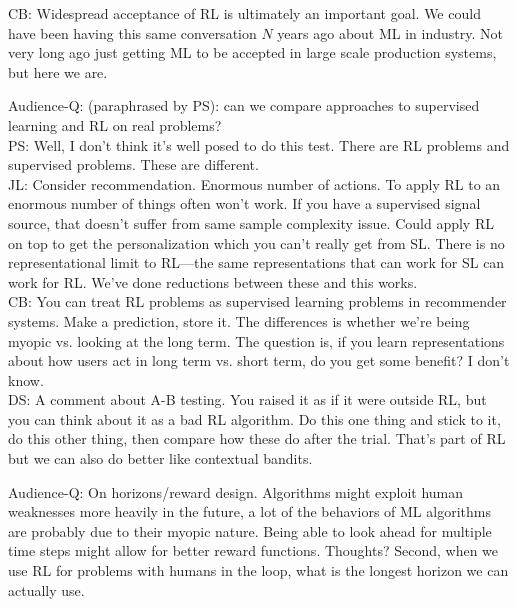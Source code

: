 CB: Widespread acceptance of RL is ultimately an important goal. We could have been having this same conversation $N$ years ago about ML in industry. Not very long ago just getting ML to be accepted in large scale production systems, but here we are. \\

\spacerule 

Audience-Q: (paraphrased by PS): can we compare approaches to supervised learning and RL on real problems? \\

PS: Well, I don't think it's well posed to do this test. There are RL problems and supervised problems. These are different. \\

JL: Consider recommendation. Enormous number of actions. To apply RL to an enormous number of things often won't work. If you have a supervised signal source, that doesn't suffer from same sample complexity issue. Could apply RL on top to get the personalization which you can't really get from SL. There is no representational limit to RL---the same representations that can work for SL can work for RL. We've done reductions between these and this works. \\

CB: You can treat RL problems as supervised learning problems in recommender systems. Make a prediction, store it. The differences is whether we're being myopic vs. looking at the long term. The question is, if you learn representations about how users act in long term vs. short term, do you get some benefit? I don't know. \\

DS: A comment about A-B testing. You raised it as if it were outside RL, but you can think about it as a bad RL algorithm. Do this one thing and stick to it, do this other thing, then compare how these do after the trial. That's part of RL but we can also do better like contextual bandits. \\

\spacerule

Audience-Q: On horizons/reward design. Algorithms might exploit human weaknesses more heavily in the future, a lot of the behaviors of ML algorithms are probably due to their myopic nature. Being able to look ahead for multiple time steps might allow for better reward functions. Thoughts? Second, when we use RL for problems with humans in the loop, what is the longest horizon we can actually use. \\

